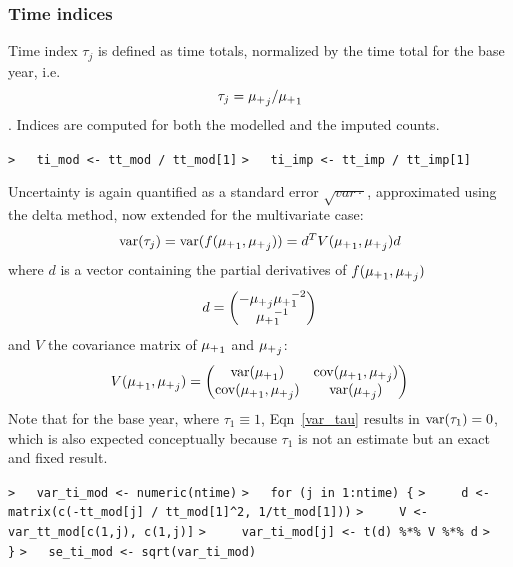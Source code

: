 \documentclass[a4paper]{article}
\begin{document}
\subsubsection{Time indices}\par

Time index $\tau_j$ is defined as time totals, normalized by the time total for the base
year, i.e.\,
$$ \tau_j = {\mu_{+}}_j / {\mu_{+}}_1 $$.
Indices are computed for both the modelled and the imputed counts.\par
\verb~>   ti_mod <- tt_mod / tt_mod[1]~\newline
\verb~>   ti_imp <- tt_imp / tt_imp[1]~\par

Uncertainty is again quantified as a standard error $\sqrt{var{\cdot}}$,
approximated using the delta method, now extended for the multivariate case:
\begin{equation}
  \operatorname{var}(\tau_j) = \operatorname{var}(f({\mu_{+}}_1,{\mu_{+}}_j)) = d^T V({\mu_{+}}_1,{\mu_{+}}_j) d \label{var_tau}
\end{equation}
where $d$ is a vector containing the partial derivatives of $f({\mu_{+}}_1,{\mu_{+}}_j)$
\begin{equation}
  d = \begin{pmatrix} -{\mu_{+}}_j {\mu_{+}}_1^{-2} \\ {\mu_{+}}_1^{-1} \end{pmatrix}
\end{equation}
and $V$ the covariance matrix of ${\mu_{+}}_1$ and ${\mu_{+}}_j$:
\begin{equation}
  V({\mu_{+}}_1,{\mu_{+}}_j) = \begin{pmatrix}
    \operatorname{var}({\mu_{+}}_1) & \operatorname{cov}({\mu_{+}}_1, {\mu_{+}}_j) \\
    \operatorname{cov}({\mu_{+}}_1, {\mu_{+}}_j) & \operatorname{var}({\mu_{+}}_j)
  \end{pmatrix}
\end{equation}
Note that for the base year, where $\tau_1\equiv1$, Eqn~\eqref{var_tau} results in
$\operatorname{var}(\tau_1)=0$, which is also expected conceptually because $\tau_1$ is not an estimate but an exact and fixed result.\par
\verb~>   var_ti_mod <- numeric(ntime)~\newline
\verb~>   for (j in 1:ntime) {~\newline
\verb~>     d <- matrix(c(-tt_mod[j] / tt_mod[1]^2, 1/tt_mod[1]))~\newline
\verb~>     V <- var_tt_mod[c(1,j), c(1,j)]~\newline
\verb~>     var_ti_mod[j] <- t(d) %*% V %*% d~\newline
\verb~>   }~\newline
\verb~>   se_ti_mod <- sqrt(var_ti_mod)~\par
\end{document}
